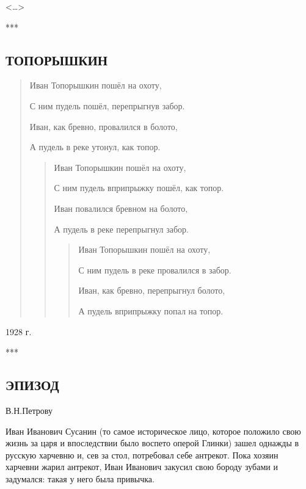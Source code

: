 \documentclass{article}
\begin{document}
\begin{flushright}<\dots>\end{flushright}
\begin{center}

***

\subsection*{\textbf{ ТОПОРЫШКИН}}\end{center}
\begin{quote}
Иван Топорышкин пошёл на охоту, 

С ним пудель пошёл, перепрыгнув забор. 

Иван, как бревно, провалился в болото, 

А пудель в реке утонул, как топор. 

\begin{verse}
Иван Топорышкин пошёл на охоту, 

С ним пудель вприпрыжку пошёл, как топор. 

Иван повалился бревном на болото, 

А пудель в реке перепрыгнул забор.

\begin{verse}
Иван Топорышкин пошёл на охоту, 

С ним пудель в реке провалился в забор. 

Иван, как бревно, перепрыгнул болото, 

А пудель вприпрыжку попал на топор. 
\end{verse}
\end{verse}
\end{quote}
\begin{flushright}1928 г.\end{flushright}

\begin{center}

***

\subsection*{\textbf{ ЭПИЗОД}}\end{center}

\begin{flushright}В.Н.Петрову\end{flushright}

Иван Иванович Сусанин (то самое историческое лицо, которое положило свою жизнь  за царя и впоследствии было воспето оперой Глинки) зашел однажды в русскую харчевню и, сев за стол, потребовал себе антрекот. Пока хозяин харчевни жарил антрекот, Иван Иванович закусил свою бороду зубами и задумался: такая у него была привычка.
    
\end{document}
